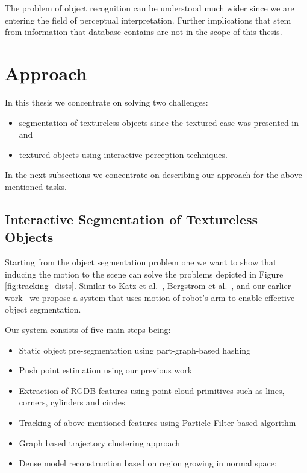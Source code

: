 The problem of object recognition can be understood much wider since we are entering the field of perceptual interpretation. Further implications that stem from information that database contains are not in the scope of this thesis.



\section{Approach} 

In this thesis we concentrate on solving two challenges: 

\begin{itemize} 
\item segmentation of textureless objects since the textured case was presented in~\cite{bersch12interactive} and~\cite{Katz-WS-MM-ICRA2011}

\item textured objects using interactive perception techniques.
\end{itemize} 

In the next subsections we concentrate on describing our approach for the above mentioned tasks.

\subsection{Interactive Segmentation of Textureless Objects} 


Starting from the object segmentation problem 
one we want to show that inducing the motion to the scene can solve the problems depicted in Figure \ref{fig:tracking_dists}. Similar  to Katz  et al.~\cite{Katz-WS-MM-ICRA2011}, Bergstrom et
al.~\cite{bergstrom11icvs}, and our earlier
work~\cite{bersch12interactive} we propose a system that uses
motion of robot's arm to enable effective
object  segmentation.

Our system consists of five main steps-being:

\begin{itemize} 
\item Static object pre-segmentation using part-graph-based hashing ~\cite{marton12SC}
\item Push point estimation using our previous work ~\cite{bersch12interactive}
\item Extraction of RGDB features using point cloud primitives such as lines, corners, cylinders and circles
\item Tracking of above mentioned features using Particle-Filter-based algorithm
\item Graph based trajectory clustering approach
\item Dense model reconstruction based on region growing in normal space;
\end{itemize} 


